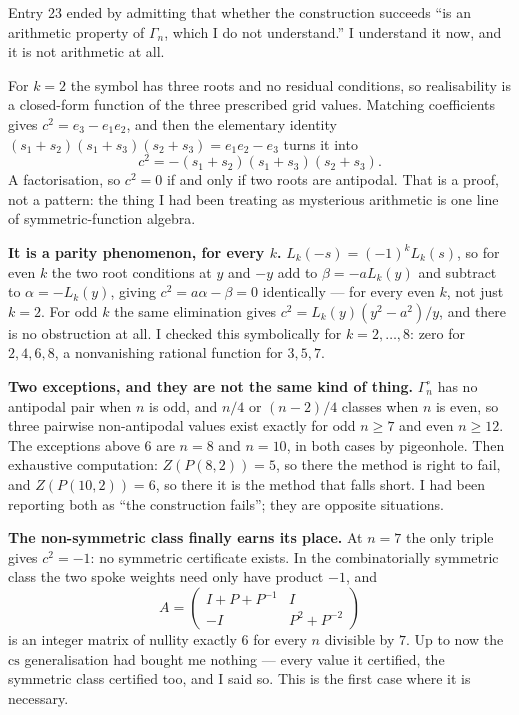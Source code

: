 \documentclass[12pt]{article}
\begin{document}
Entry 23 ended by admitting that whether the construction succeeds ``is an
arithmetic property of $\Gamma_n$, which I do not understand.'' I understand it
now, and it is not arithmetic at all.

For $k=2$ the symbol has three roots and no residual conditions, so
realisability is a closed-form function of the three prescribed grid values.
Matching coefficients gives $c^{2}=e_3-e_1e_2$, and then the elementary
identity $(s_1+s_2)(s_1+s_3)(s_2+s_3)=e_1e_2-e_3$ turns it into
\[
  c^{2}=-(s_1+s_2)(s_1+s_3)(s_2+s_3).
\]
A factorisation, so $c^{2}=0$ if and only if two roots are antipodal. That is a
proof, not a pattern: the thing I had been treating as mysterious arithmetic is
one line of symmetric-function algebra.

\textbf{It is a parity phenomenon, for every $k$.} $L_k(-s)=(-1)^{k}L_k(s)$,
so for even $k$ the two root conditions at $y$ and $-y$ add to
$\beta=-aL_k(y)$ and subtract to $\alpha=-L_k(y)$, giving $c^{2}=a\alpha-\beta=0$
identically --- for every even $k$, not just $k=2$. For odd $k$ the same
elimination gives $c^{2}=L_k(y)(y^{2}-a^{2})/y$, and there is no obstruction at
all. I checked this symbolically for $k=2,\dots,8$: zero for $2,4,6,8$, a
nonvanishing rational function for $3,5,7$.

\textbf{Two exceptions, and they are not the same kind of thing.}
$\Gamma^{\circ}_n$ has no antipodal pair when $n$ is odd, and $n/4$ or
$(n-2)/4$ classes when $n$ is even, so three pairwise non-antipodal values
exist exactly for odd $n\ge7$ and even $n\ge12$. The exceptions above $6$ are
$n=8$ and $n=10$, in both cases by pigeonhole. Then exhaustive computation:
$Z(P(8,2))=5$, so there the method is right to fail, and $Z(P(10,2))=6$, so
there it is the method that falls short. I had been reporting both as ``the
construction fails''; they are opposite situations.

\textbf{The non-symmetric class finally earns its place.} At $n=7$ the only
triple gives $c^{2}=-1$: no symmetric certificate exists. In the
combinatorially symmetric class the two spoke weights need only have product
$-1$, and
\[
  A=\begin{pmatrix} I+P+P^{-1} & I\\ -I & P^{2}+P^{-2}\end{pmatrix}
\]
is an integer matrix of nullity exactly $6$ for every $n$ divisible by $7$. Up
to now the $\mathrm{cs}$ generalisation had bought me nothing --- every value
it certified, the symmetric class certified too, and I said so. This is the
first case where it is necessary.
\end{document}
